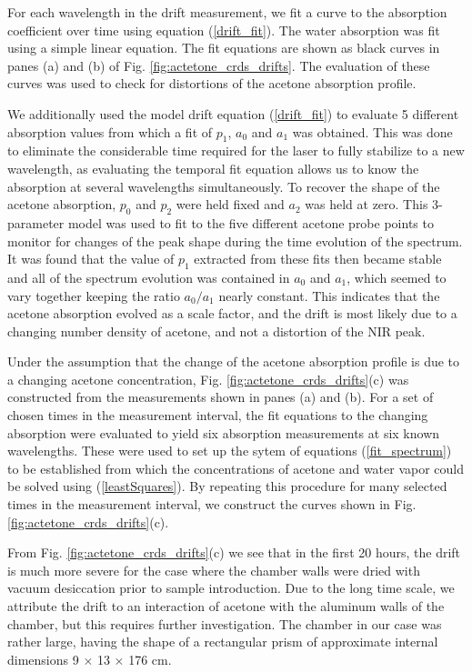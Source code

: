 \documentclass[8pt,a4paper]{report}
\begin{document}
	For each wavelength in the drift measurement, we fit a curve to the absorption coefficient over time using equation (\ref{drift_fit}). The water absorption was fit using a simple linear equation. The fit equations are shown as black curves in panes (a) and (b) of Fig. \ref{fig:actetone_crds_drifts}. The evaluation of these curves was used to check for distortions of the acetone absorption profile.
	
	We additionally used the model drift equation (\ref{drift_fit}) to evaluate 5 different absorption values from which a fit of $p_1$, $a_0$ and $a_1$ was obtained. This was done to eliminate the considerable time required for the laser to fully stabilize to a new wavelength, as evaluating the temporal fit equation allows us to know the absorption at several wavelengths simultaneously. To recover the shape of the acetone absorption, $p_0$ and $p_2$ were held fixed and $a_2$ was held at zero. This 3-parameter model was used to fit to the five different acetone probe points to monitor for changes of the peak shape during the time evolution of the spectrum. It was found that the value of $p_1$ extracted from these fits then became stable and all of the spectrum evolution was contained in $a_0$ and $a_1$, which seemed to vary together keeping the ratio $a_0/a_1$ nearly constant. This indicates that the acetone absorption evolved as a scale factor, and the drift is most likely due to a changing number density of acetone, and not a distortion of the NIR peak.
	
	Under the assumption that the change of the acetone absorption profile is due to a changing acetone concentration, Fig. \ref{fig:actetone_crds_drifts}(c) was constructed from the measurements shown in panes (a) and (b). For a set of chosen times in the measurement interval, the fit equations to the changing absorption were evaluated to yield six absorption measurements at six known wavelengths. These were used to set up the sytem of equations (\ref{fit_spectrum}) to be established from which the concentrations of acetone and water vapor could be solved using (\ref{leastSquares}). By repeating this procedure for many selected times in the measurement interval, we construct the curves shown in Fig. \ref{fig:actetone_crds_drifts}(c).
	
	From Fig. \ref{fig:actetone_crds_drifts}(c) we see that in the first 20 hours, the drift is much more severe for the case where the chamber walls were dried with vacuum desiccation prior to sample introduction. Due to the long time scale, we attribute the drift to an interaction of acetone with the aluminum walls of the chamber, but this requires further investigation. The chamber in our case was rather large, having the shape of a rectangular prism of approximate internal dimensions 9 $\times$ 13 $\times$ 176 cm.
	
\end{document}
